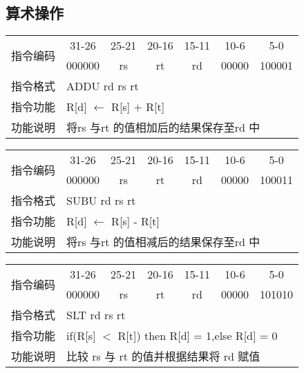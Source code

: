 \subsection{算术操作}
	\begin{table}[!hbp]
		\centering
		\begin{tabular}{|c|c|c|c|c|c|c|}
		\hline
		\multirow{2}{*}{指令编码} & 31-26&25-21 & 20-16&15-11 &10-6 &5-0\\
		\cline{2-7} & 000000 & rs & rt & rd & 00000 & 100001 \\
		\hline
		指令格式&\multicolumn{6}{|l|}{ADDU rd rs rt}\\
		\hline		
		指令功能&\multicolumn{6}{|l|}{R[d] $\leftarrow$ R[s] + R[t]}\\
		\hline		
		功能说明&\multicolumn{6}{|l|}{将rs 与rt 的值相加后的结果保存至rd 中}\\
		\hline
		\end{tabular}
	\end{table}
	\begin{table}[!hbp]
		\centering
		\begin{tabular}{|c|c|c|c|c|c|c|}
		\hline
		\multirow{2}{*}{指令编码} & 31-26&25-21 & 20-16&15-11 &10-6 &5-0\\
		\cline{2-7} & 000000 & rs & rt & rd & 00000 & 100011 \\
		\hline
		指令格式&\multicolumn{6}{|l|}{SUBU rd rs rt}\\
		\hline		
		指令功能&\multicolumn{6}{|l|}{R[d] $\leftarrow$ R[s] - R[t]}\\
		\hline		
		功能说明&\multicolumn{6}{|l|}{将rs 与rt 的值相减后的结果保存至rd 中}\\
		\hline
		\end{tabular}
	\end{table}
	\begin{table}[!hbp]
		\centering
		\begin{tabular}{|c|c|c|c|c|c|c|}
		\hline
		\multirow{2}{*}{指令编码} & 31-26&25-21 & 20-16&15-11 &10-6 &5-0\\
		\cline{2-7} & 000000 & rs & rt & rd & 00000 & 101010 \\
		\hline
		指令格式&\multicolumn{6}{|l|}{SLT rd rs rt}\\
		\hline		
		指令功能&\multicolumn{6}{|l|}{if(R[s] $<$ R[t]) then R[d] = 1,else R[d] = 0}\\
		\hline		
		功能说明&\multicolumn{6}{|l|}{比较 rs 与 rt 的值并根据结果将 rd 赋值}\\
		\hline
		\end{tabular}
	\end{table}
